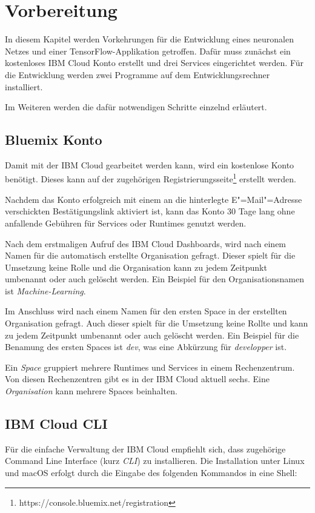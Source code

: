 \section{Vorbereitung}
In diesem Kapitel werden Vorkehrungen für die Entwicklung eines neuronalen Netzes und einer TensorFlow-Applikation
getroffen. Dafür muss zunächst ein kostenloses IBM Cloud Konto erstellt und drei Services eingerichtet werden.
Für die Entwicklung werden zwei Programme auf dem Entwicklungsrechner installiert.

Im Weiteren werden die dafür notwendigen Schritte einzelnd erläutert.

\subsection{Bluemix Konto}
Damit mit der IBM Cloud gearbeitet werden kann, wird ein kostenlose Konto benötigt. Dieses kann auf der zugehörigen
Registrierungsseite\footnote{https://console.bluemix.net/registration} erstellt werden.

Nachdem das Konto erfolgreich mit einem an die hinterlegte E"=Mail"=Adresse verschickten Bestätigungslink aktiviert ist,
kann das Konto 30 Tage lang ohne anfallende Gebühren für Services oder Runtimes genutzt werden.

Nach dem erstmaligen Aufruf des IBM Cloud Dashboards, wird nach einem Namen für die automatisch erstellte Organisation
gefragt. Dieser spielt für die Umsetzung keine Rolle und die Organisation kann zu jedem Zeitpunkt umbenannt oder auch
gelöscht werden. Ein Beispiel für den Organisationsnamen ist \textit{Machine-Learning}.

Im Anschluss wird nach einem Namen für den ersten Space in der erstellten Organisation gefragt. Auch dieser
spielt für die Umsetzung keine Rollte und kann zu jedem Zeitpunkt umbenannt oder auch gelöscht werden. Ein Beispiel für
die Benamung des ersten Spaces ist \textit{dev}, was eine Abkürzung für \textit{developper} ist.

Ein \textit{Space} gruppiert mehrere Runtimes und Services in einem Rechenzentrum. Von diesen Rechenzentren gibt es in
der IBM Cloud aktuell sechs. Eine \textit{Organisation} kann mehrere Spaces beinhalten.

\subsection{IBM Cloud CLI}
Für die einfache Verwaltung der IBM Cloud empfiehlt sich, dass zugehörige Command Line Interface (kurz \textit{CLI}) zu
installieren. Die Installation unter Linux und macOS erfolgt durch die Eingabe des folgenden Kommandos in eine Shell:

